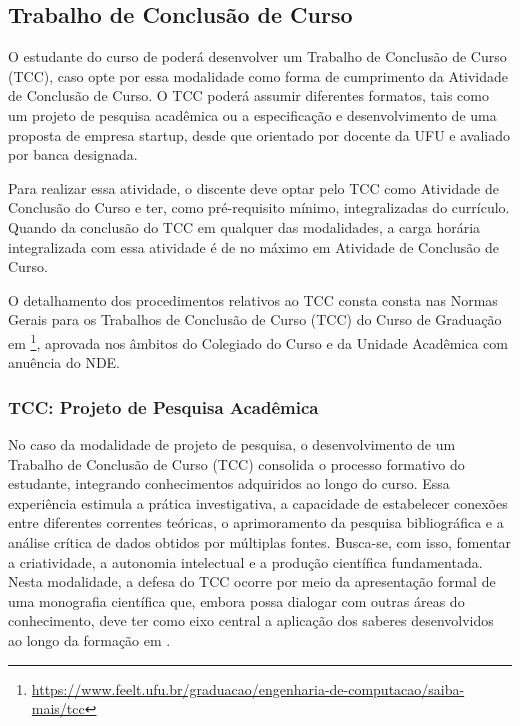 \subsection{Trabalho de Conclusão de Curso}

O estudante do curso de \nomecursonovo poderá desenvolver um Trabalho de Conclusão de Curso (TCC), caso opte por essa modalidade como forma de cumprimento da Atividade de Conclusão de Curso. O TCC poderá assumir diferentes formatos, tais como um projeto de pesquisa acadêmica ou a especificação e desenvolvimento de uma proposta de empresa startup, desde que orientado por docente da UFU e avaliado por banca designada.

Para realizar essa atividade, o discente deve optar pelo TCC como Atividade de Conclusão do Curso e ter, como pré-requisito mínimo,  integralizadas do currículo. Quando da conclusão do TCC em qualquer das modalidades, a carga horária integralizada com essa atividade é de no máximo em Atividade de Conclusão de Curso.

O detalhamento dos procedimentos relativos ao TCC consta consta nas Normas Gerais para os Trabalhos de Conclusão de Curso (TCC) do Curso de Graduação em \nomecursonovo\footnote{\url{https://www.feelt.ufu.br/graduacao/engenharia-de-computacao/saiba-mais/tcc}}, aprovada nos âmbitos do Colegiado do Curso e da Unidade Acadêmica com anuência do NDE.

\subsubsection{TCC: Projeto de Pesquisa Acadêmica}

No caso da modalidade de projeto de pesquisa, o desenvolvimento de um Trabalho de Conclusão de Curso (TCC) consolida o processo formativo do estudante, integrando conhecimentos adquiridos ao longo do curso. Essa experiência estimula a prática investigativa, a capacidade de estabelecer conexões entre diferentes correntes teóricas, o aprimoramento da pesquisa bibliográfica e a análise crítica de dados obtidos por múltiplas fontes. Busca-se, com isso, fomentar a criatividade, a autonomia intelectual e a produção científica fundamentada. Nesta modalidade, a defesa do TCC ocorre por meio da apresentação formal de uma monografia científica que, embora possa dialogar com outras áreas do conhecimento, deve ter como eixo central a aplicação dos saberes desenvolvidos ao longo da formação em \nomecursonovo.

